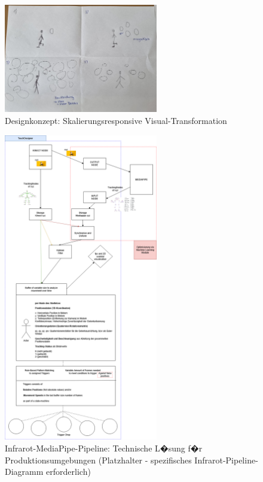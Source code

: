 \begin{figure}[!htbp]
    \centering
    \includegraphics[width=0.6\textwidth,height=0.25\textheight,keepaspectratio]{images/Sprint3_1.jpg}
    \caption{Designkonzept: Skalierungsresponsive Visual-Transformation}
    \label{fig:design_evolution}
\end{figure}

\begin{figure}[!htbp]
    \centering
    \includegraphics[width=0.6\textwidth,height=0.25\textheight,keepaspectratio]{images/MASK.png}
    \caption{Infrarot-MediaPipe-Pipeline: Technische L�sung f�r Produktionsumgebungen (Platzhalter - spezifisches Infrarot-Pipeline-Diagramm erforderlich)}
    \label{fig:infrared_solution}
\end{figure}

